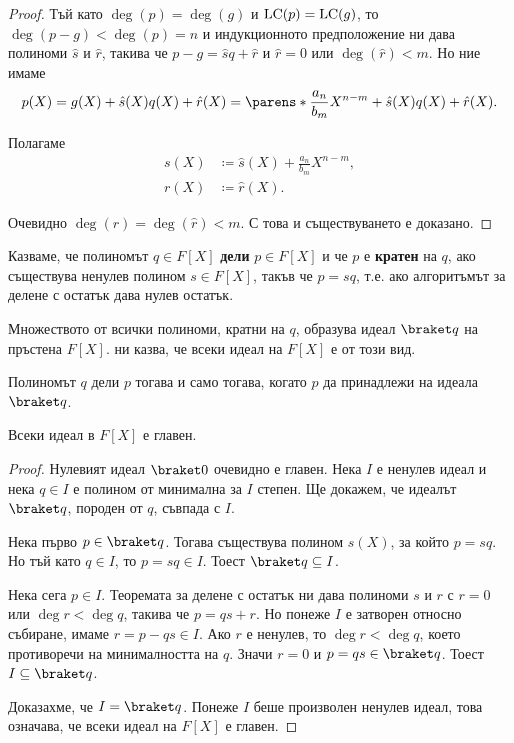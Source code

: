 \documentclass{../../common/topic}
\begin{document}
\begin{proof}
  Тъй като \( \deg(p) = \deg(g) \) и \( \operatorname{LC}(p) = \operatorname{LC}(g) \), то \( \deg(p - g) < \deg(p) = n \) и индукционното предположение ни дава полиноми \( \hat s \) и \( \hat r \), такива че \( p - g = \hat s q + \hat r \) и \( \hat r = 0 \) или \( \deg(\hat r) < m \). Но ние имаме
  \begin{equation*}
    p(X)
    =
    g(X) + \hat s(X) q(X) + \hat r(X)
    =
    \parens*{ \frac {a_n} {b_m} X^{n-m} + \hat s(X) } q(X) + \hat r(X).
  \end{equation*}

  Полагаме
  \begin{align*}
    s(X) &\coloneqq \hat s(X) + \frac {a_n} {b_m} X^{n-m}, \\
    r(X) &\coloneqq \hat r(X).
  \end{align*}

  Очевидно \( \deg(r) = \deg(\hat r) < m \). С това и съществуването е доказано.
\end{proof}

\begin{definition}
  Казваме, че полиномът \( q \in F[X] \) \textbf{дели} \( p \in F[X] \) и че \( p \) е \textbf{кратен} на \( q \), ако съществува ненулев полином \( s \in F[X] \), такъв че \( p = sq \), т.е. ако алгоритъмът за делене с остатък дава нулев остатък.

  Множеството от всички полиноми, кратни на \( q \), образува идеал \( \braket q \) на пръстена \( F[X] \).  ни казва, че всеки идеал на \( F[X] \) е от този вид.
\end{definition}

Полиномът \( q \) дели \( p \) тогава и само тогава, когато \( p \) да принадлежи на идеала \( \braket q \).

\begin{theorem}\label{thm:polynomial_ideals_are_principal}
  Всеки идеал в \( F[X] \) е главен.
\end{theorem}
\begin{proof}
  Нулевият идеал \( \braket 0 \) очевидно е главен. Нека \( I \) е ненулев идеал и нека \( q \in I \) е полином от минимална за \( I \) степен. Ще докажем, че идеалът \( \braket q \), породен от \( q \), съвпада с \( I \).

  Нека първо \( p \in \braket q \). Тогава съществува полином \( s(X) \), за който \( p = sq \). Но тъй като \( q \in I \), то \( p = sq \in I \). Тоест \( \braket q \subseteq I \).

  Нека сега \( p \in I \). Теоремата за делене с остатък ни дава полиноми \( s \) и \( r \) с \( r = 0 \) или \( \deg r < \deg q \), такива че \( p = qs + r \). Но понеже \( I \) е затворен относно събиране, имаме \( r = p - qs \in I \). Ако \( r \) е ненулев, то \( \deg r < \deg q \), което противоречи на минималността на \( q \). Значи \( r = 0 \) и \( p = qs \in \braket q \). Тоест \( I \subseteq \braket q \).

  Доказахме, че \( I = \braket q \). Понеже \( I \) беше произволен ненулев идеал, това означава, че всеки идеал на \( F[X] \) е главен.
\end{proof}
\end{document}
